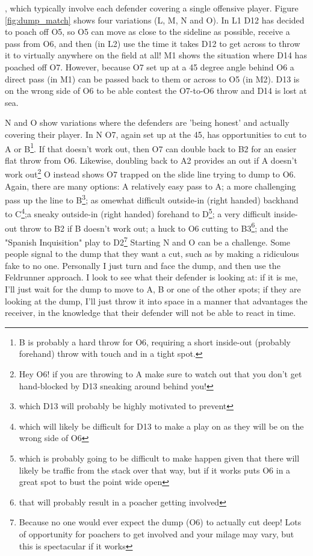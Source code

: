 \documentclass{tufte-handout}
\begin{document}
, which typically involve each defender covering a single offensive player. Figure \ref{fig:dump_match} shows four variations (L, M, N and O).  In L1 D12 has decided to poach off O5, so O5 can move as close to the sideline as possible, receive a pass from O6, and then (in L2) use the time it takes D12 to get across to throw it to virtually anywhere on the field at all! M1 shows the situation where D14 has poached off O7.  However, because O7 set up at a 45 degree angle behind O6 a direct pass (in M1) can be passed back to them or across to O5 (in M2).  D13 is on the wrong side of O6 to be able contest the O7-to-O6 throw and D14 is lost at sea. 

N and O show variations where the defenders are 'being honest' and actually covering their player.  In N O7, again set up at the 45, has opportunities to cut to A or B\footnote{B is probably a hard throw for O6, requiring a short inside-out (probably forehand) throw with touch and in a tight spot.}.  If that doesn't work out, then O7 can double back to B2 for an easier flat throw from O6.  Likewise, doubling back to A2 provides an out if A doesn't work out\footnote{Hey O6! if you are throwing to A make sure to watch out that you don't get hand-blocked by D13 sneaking around behind you!} O instead shows O7 trapped on the slide line trying to dump to O6.  Again, there are many options: A relatively easy pass to A; 
a more challenging pass up the line to B\footnote{which D13 will probably be highly motivated to prevent}; as omewhat difficult outside-in (right handed) backhand  to C\footnote{which will likely be difficult for D13 to make a play on as they will be on the wrong side of O6};a sneaky outside-in (right handed) forehand to D\footnote{which is probably going to be difficult to make happen given that there will likely be traffic from the stack over that way, but if it works puts O6 in a great spot to bust the point wide open}; a very difficult inside-out throw to B2 if B doesn't work out; a huck to O6 cutting to B3\footnote{that will probably result in a poacher getting involved}; and 
the "Spanish Inquisition" play to D2\footnote{Because no one would ever expect the dump (O6) to actually cut deep! Lots of opportunity for poachers to get involved and your milage may vary, but this is spectacular if it works} 
Starting N and O can be a challenge.  
Some people signal to the dump 
that they want a cut,
such as by making a ridiculous 
fake to no one.
Personally I just turn and face 
the dump, 
and then use 
the Feldrunner approach. 
I look to see what 
their defender 
is looking at: 
if it is me, 
I'll just wait 
for the dump to move 
to A, B or one of the other spots;
if they are looking at the dump, 
I'll just throw it into space 
in a manner that advantages 
the receiver, 
in the knowledge 
that their defender 
will not be able to 
react in time. 
\end{document}
